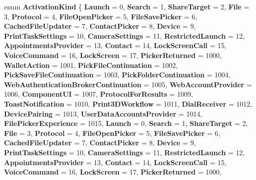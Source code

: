 \begin{DoxyCompactItemize}
enum {\bfseries Activation\+Kind} \{ \newline
{\bfseries Launch} = 0, 
{\bfseries Search} = 1, 
{\bfseries Share\+Target} = 2, 
{\bfseries File} = 3, 
\newline
{\bfseries Protocol} = 4, 
{\bfseries File\+Open\+Picker} = 5, 
{\bfseries File\+Save\+Picker} = 6, 
{\bfseries Cached\+File\+Updater} = 7, 
\newline
{\bfseries Contact\+Picker} = 8, 
{\bfseries Device} = 9, 
{\bfseries Print\+Task\+Settings} = 10, 
{\bfseries Camera\+Settings} = 11, 
\newline
{\bfseries Restricted\+Launch} = 12, 
{\bfseries Appointments\+Provider} = 13, 
{\bfseries Contact} = 14, 
{\bfseries Lock\+Screen\+Call} = 15, 
\newline
{\bfseries Voice\+Command} = 16, 
{\bfseries Lock\+Screen} = 17, 
{\bfseries Picker\+Returned} = 1000, 
{\bfseries Wallet\+Action} = 1001, 
\newline
{\bfseries Pick\+File\+Continuation} = 1002, 
{\bfseries Pick\+Save\+File\+Continuation} = 1003, 
{\bfseries Pick\+Folder\+Continuation} = 1004, 
{\bfseries Web\+Authentication\+Broker\+Continuation} = 1005, 
\newline
{\bfseries Web\+Account\+Provider} = 1006, 
{\bfseries Component\+UI} = 1007, 
{\bfseries Protocol\+For\+Results} = 1009, 
{\bfseries Toast\+Notification} = 1010, 
\newline
{\bfseries Print3\+D\+Workflow} = 1011, 
{\bfseries Dial\+Receiver} = 1012, 
{\bfseries Device\+Pairing} = 1013, 
{\bfseries User\+Data\+Accounts\+Provider} = 1014, 
\newline
{\bfseries File\+Picker\+Experience} = 1015, 
{\bfseries Launch} = 0, 
{\bfseries Search} = 1, 
{\bfseries Share\+Target} = 2, 
\newline
{\bfseries File} = 3, 
{\bfseries Protocol} = 4, 
{\bfseries File\+Open\+Picker} = 5, 
{\bfseries File\+Save\+Picker} = 6, 
\newline
{\bfseries Cached\+File\+Updater} = 7, 
{\bfseries Contact\+Picker} = 8, 
{\bfseries Device} = 9, 
{\bfseries Print\+Task\+Settings} = 10, 
\newline
{\bfseries Camera\+Settings} = 11, 
{\bfseries Restricted\+Launch} = 12, 
{\bfseries Appointments\+Provider} = 13, 
{\bfseries Contact} = 14, 
\newline
{\bfseries Lock\+Screen\+Call} = 15, 
{\bfseries Voice\+Command} = 16, 
{\bfseries Lock\+Screen} = 17, 
{\bfseries Picker\+Returned} = 1000, 
\newline

\end{DoxyCompactItemize}
